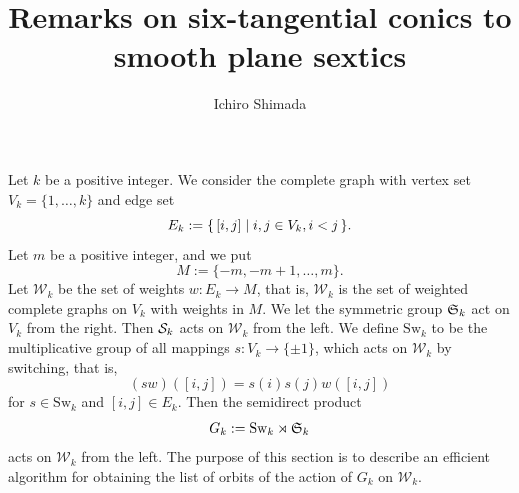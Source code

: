 \documentclass{amsart} %
\newcommand{\Sw}{\mathrm{Sw}}
\newcommand{\Wk}{\mathcal{W}_k}
\begin{document}
%
\title{Remarks on  six-tangential conics to smooth plane sextics} 
\author{Ichiro Shimada}
\address{Department of Mathematics,
Graduate School of Science,
Hiroshima University,
1-3-1 Kagamiyama,
Higashi-Hiroshima,
739-8526 JAPAN}
%
%

%
\begin{abstract}
\end{abstract}
%

\keywords{}
\maketitle

Let $k$ be a positive integer.
We consider the complete graph with vertex set $V_k=\{1, \dots, k\}$ and edge set 
\[
E_k:=\{\,{[i, j]}\mid {i, j\in V_k, i<j} \,\}.
\]
Let $m$ be a positive integer, and we put 
\[
M:=\{-m,-m+1, \dots, m\}.
\]
Let $\Wk$ be the set of weights $w \colon E_k \to M$, 
that is, $\Wk$ is the set of weighted complete graphs on $V_k$
with weights in $M$.
We let  the symmetric group $\mathord{\mathfrak{S}}_k$ act on $V_k$ from the right.
Then $\mathord{\mathcal{S}}_k$ acts on $\Wk$ from the left.
We  define $\Sw_k$ to be the multiplicative group of all mappings
$s \colon V_k \to \{\pm 1\}$, 
which acts on $\Wk$ by switching, 
that is, 
\[
(sw) ([i, j])= s(i) s(j)  w([i, j])
\]
for $s\in \Sw_k$ and $[i, j]\in E_k$.
Then the semidirect product
\[
G_k := \Sw_k \rtimes \SSSS_k
\]
acts on $\Wk$ from the left.
The purpose of this section is to describe an efficient algorithm
for obtaining the list of 
orbits of the action of $G_k$ on $\Wk$.
\end{document}
